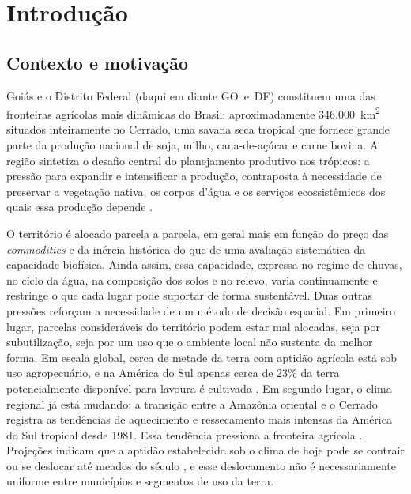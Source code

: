 \chapter{Introdução}\label{ch:intro}

\section{Contexto e motivação}

Goiás e o Distrito Federal (daqui em diante GO~e~DF) constituem uma das fronteiras agrícolas mais dinâmicas do Brasil:
aproximadamente 346.000~km\textsuperscript{2} situados inteiramente no Cerrado, uma savana seca tropical
que fornece grande parte da produção nacional de soja, milho, cana-de-açúcar e carne bovina. A região sintetiza
o desafio central do planejamento produtivo nos trópicos: a pressão para expandir e intensificar a produção,
contraposta à necessidade de preservar a vegetação nativa, os corpos d'água e os serviços ecossistêmicos
dos quais essa produção depende \citep{spera_agricultural_2017,gomes_agricultural_2019}.

O território é alocado parcela a parcela, em geral mais em função do preço das \emph{commodities} e
da inércia histórica do que de uma avaliação sistemática da capacidade biofísica.
Ainda assim, essa capacidade, expressa no regime de chuvas, no ciclo da água, na
composição dos solos e no relevo, varia continuamente e restringe o que cada lugar pode
suportar de forma sustentável. Duas outras pressões reforçam a necessidade de um método de decisão
espacial. Em primeiro lugar, parcelas consideráveis do território podem estar mal alocadas, seja por
subutilização, seja por um uso que o ambiente local não sustenta da melhor forma. Em escala global,
cerca de metade da terra com aptidão agrícola está sob uso agropecuário, e na América do Sul apenas
cerca de 23\% da terra potencialmente disponível para lavoura é cultivada
\citep[pp.~3--4, 10]{schneider_global_2022}. Em segundo lugar, o clima regional já
está mudando: a transição entre a Amazônia oriental e o Cerrado registra as tendências de aquecimento e
ressecamento mais intensas da América do Sul tropical desde 1981. Essa tendência pressiona a fronteira
agrícola \citep[pp.~1, 6]{marengo_increased_2022}. Projeções indicam que a aptidão estabelecida sob o clima
de hoje pode se contrair ou se deslocar até meados do século \citep[p.~11]{souza_climate-driven_2026}, e esse
deslocamento não é necessariamente uniforme entre municípios e segmentos de uso da terra.

